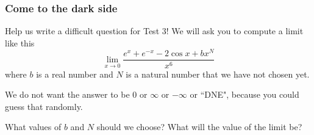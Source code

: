 \documentclass[14pt]{beamer}
\begin{document}

	\begin{frame}[t]
		\fontsize{13}{13}\selectfont
		\frametitle{Come to the dark side}

		Help us write a difficult question for Test 3! We will ask you to compute a
		limit like this
		\[
			\lim_{x \to 0}\frac{e^{x}+ e^{-x}- 2 \cos x + bx^{N}}{x^{6}}
		\]
		where $b$ is a real number and $N$ is a natural number that we have not
		chosen yet.

		We do not want the answer to be $0$ or $\infty$ or $-\infty$ or ``DNE",
		because you could guess that randomly.

		What values of $b$ and $N$ should we choose? What will the value of the limit
		be?
	\end{frame}
\end{document}
